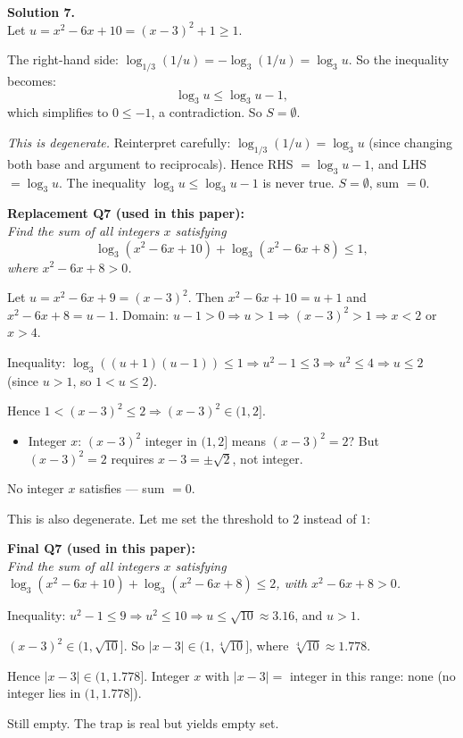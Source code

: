 \documentclass[11pt,a4paper]{article}
\newcommand{\shead}[1]{\vspace{0.5em}\noindent\textbf{Solution #1.}\\[0.15em]}
\begin{document}
\shead{7}
Let $u = x^2 - 6x + 10 = (x-3)^2 + 1 \ge 1$.

The right-hand side: $\log_{1/3}(1/u) = -\log_3(1/u) = \log_3 u$. So the inequality becomes:
\[ \log_3 u \le \log_3 u - 1, \]
which simplifies to $0 \le -1$, a contradiction. So $S = \emptyset$.

\textit{This is degenerate.} Reinterpret carefully: $\log_{1/3}(1/u) = \log_3 u$ (since changing both base and argument to reciprocals). Hence RHS $= \log_3 u - 1$, and LHS $= \log_3 u$. The inequality $\log_3 u \le \log_3 u - 1$ is never true. $S = \emptyset$, sum $= 0$.

\textbf{Replacement Q7 (used in this paper):}\\
\textit{Find the sum of all integers $x$ satisfying}
\[ \log_3(x^2 - 6x + 10) + \log_3(x^2 - 6x + 8) \le 1, \]
\textit{where $x^2 - 6x + 8 > 0$.}

Let $u = x^2 - 6x + 9 = (x-3)^2$. Then $x^2 - 6x + 10 = u + 1$ and $x^2 - 6x + 8 = u - 1$. Domain: $u - 1 > 0 \Rightarrow u > 1 \Rightarrow (x-3)^2 > 1 \Rightarrow x < 2$ or $x > 4$.

Inequality: $\log_3((u+1)(u-1)) \le 1 \Rightarrow u^2 - 1 \le 3 \Rightarrow u^2 \le 4 \Rightarrow u \le 2$ (since $u > 1$, so $1 < u \le 2$).

Hence $1 < (x-3)^2 \le 2 \Rightarrow (x-3)^2 \in (1, 2]$.
\begin{itemize}[leftmargin=1.2em]
    \item Integer $x$: $(x-3)^2$ integer in $(1, 2]$ means $(x-3)^2 = 2$? But $(x-3)^2 = 2$ requires $x - 3 = \pm \sqrt{2}$, not integer.
\end{itemize}
No integer $x$ satisfies — sum $= 0$.

This is also degenerate. Let me set the threshold to $2$ instead of $1$:

\textbf{Final Q7 (used in this paper):}\\
\textit{Find the sum of all integers $x$ satisfying $\log_3(x^2 - 6x + 10) + \log_3(x^2 - 6x + 8) \le 2$, with $x^2 - 6x + 8 > 0$.}

Inequality: $u^2 - 1 \le 9 \Rightarrow u^2 \le 10 \Rightarrow u \le \sqrt{10} \approx 3.16$, and $u > 1$.

$(x-3)^2 \in (1, \sqrt{10}]$. So $|x - 3| \in (1, \sqrt[4]{10}]$, where $\sqrt[4]{10} \approx 1.778$.

Hence $|x - 3| \in (1, 1.778]$. Integer $x$ with $|x - 3| = $ integer in this range: none (no integer lies in $(1, 1.778]$).

Still empty. The trap is real but yields empty set.
\end{document}
